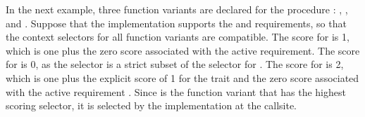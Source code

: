 

In the next example, three function variants are declared for the procedure
: , , and 
. Suppose that the implementation supports the 
 and  requirements, so that
the context selectors for all function variants are compatible. The score for 
 is 1, which is one plus the zero score associated with
the active  requirement. The score for 
 is 0, as the selector is a strict subset of the 
selector for . The score for 
 is 2, which is one plus the explicit score of 1
for the  trait and the zero score associated with the active
 requirement . Since 
is the function variant that has the highest scoring selector, it is selected
by the implementation at the callsite.


